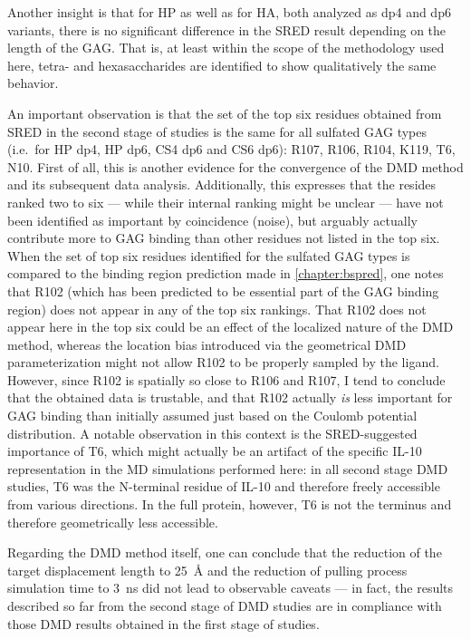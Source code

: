 Another insight is that for HP as well as for HA, both analyzed as dp4 and dp6
variants, there is no significant difference in the SRED result depending on the
length of the GAG. That is, at least within the scope of the methodology used
here, tetra- and hexasaccharides are identified to show qualitatively the same
behavior.

An important observation is that the set of the top six residues obtained from
SRED in the second stage of studies is the same for all sulfated GAG types
(i.e.\ for HP dp4, HP dp6, CS4 dp6 and CS6 dp6): R107, R106, R104, K119, T6,
N10. First of all, this is another evidence for the convergence of the DMD
method and its subsequent data analysis. Additionally, this expresses that the
resides ranked two to six --- while their internal ranking might be unclear ---
have not been identified as important by coincidence (noise), but arguably
actually contribute more to GAG binding than other residues not listed in the
top six. When the set of top six residues identified for the sulfated GAG types
is compared to the binding region prediction made in \cref{chapter:bspred}, one
notes that R102 (which has been predicted to be essential part of the GAG
binding region) does not appear in any of the top six rankings. That R102 does
not appear here in the top six could be an effect of the localized nature of the
DMD method, whereas the location bias introduced via the geometrical DMD
parameterization might not allow R102 to be properly sampled by the ligand.
However, since R102 is spatially so close to R106 and R107, I tend to conclude
that the obtained data is trustable, and that R102 actually \textit{is} less
important for GAG binding than initially assumed just based on the Coulomb
potential distribution. A notable observation in this context is the
SRED-suggested importance of T6, which might actually be an artifact of the
specific IL-10 representation in the MD simulations performed here: in all
second stage DMD studies, T6 was the N-terminal residue of IL-10 and therefore
freely accessible from various directions. In the full protein, however, T6 is
not the terminus and therefore geometrically less accessible.

Regarding the DMD method itself, one can conclude that the reduction of the
target displacement length to \SI{25}{\angstrom} and the reduction of pulling
process simulation time to \SI{3}{\nano\second} did not lead to observable
caveats --- in fact, the results described so far from the second stage of DMD
studies are in compliance with those DMD results obtained in the first stage of
studies.


